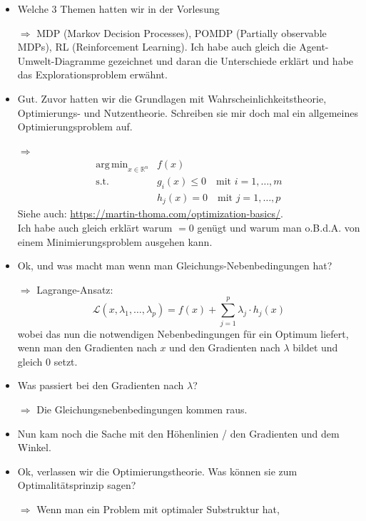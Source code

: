 \documentclass[a4paper]{article}
\DeclareMathOperator*{\argmin}{arg\,min}
\begin{document}
    \begin{itemize}
        \item Welche 3 Themen hatten wir in der Vorlesung
        \item[$\Rightarrow$] MDP (Markov Decision Processes), POMDP (Partially observable MDPs),
                             RL (Reinforcement Learning). Ich habe
                             auch gleich die Agent-Umwelt-Diagramme gezeichnet
                             und daran die Unterschiede erklärt und habe das
                             Explorationsproblem erwähnt.
        \item Gut. Zuvor hatten wir die Grundlagen mit Wahrscheinlichkeitstheorie,
              Optimierungs- und Nutzentheorie. Schreiben sie mir doch mal ein
              allgemeines Optimierungsproblem auf.
        \item[$\Rightarrow$] 
        \begin{align}
        \argmin_{x \in \mathbb{R}^n}& f(x)\\
        \text{s.t. } & g_i(x) \leq 0 \quad \text{mit } i = 1, \dots, m\\
             & h_j(x) = 0 \quad \text{mit } j = 1, \dots, p
        \end{align}
        Siehe auch: \href{https://martin-thoma.com/optimization-basics/}{https://martin-thoma.com/optimization-basics/}.\\
        Ich habe auch gleich erklärt warum $=0$ genügt und warum man o.B.d.A.
        von einem Minimierungsproblem ausgehen kann.
        \item Ok, und was macht man wenn man Gleichungs-Nebenbedingungen hat?
        \item[$\Rightarrow$] Lagrange-Ansatz:
        $$\mathcal{L}(x, \lambda_1, \dots, \lambda_p) = f(x) + \sum_{j=1}^p \lambda_j \cdot h_j(x)$$
        wobei das nun die notwendigen Nebenbedingungen für ein Optimum liefert,
        wenn man den Gradienten nach $x$ und den Gradienten nach $\lambda$
        bildet und gleich 0 setzt.
        \item Was passiert bei den Gradienten nach $\lambda$?
        \item[$\Rightarrow$] Die Gleichungsnebenbedingungen kommen raus.
        \item Nun kam noch die Sache mit den Höhenlinien / den Gradienten und
              dem Winkel.
        \item Ok, verlassen wir die Optimierungstheorie. Was können sie zum
              Optimalitätsprinzip sagen?
        \item[$\Rightarrow$] Wenn man ein Problem mit optimaler Substruktur hat,

\end{itemize}
\end{document}
